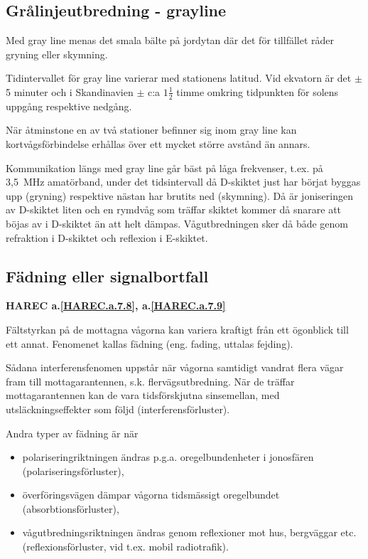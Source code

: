\subsection{Grålinjeutbredning - grayline}

Med gray line menas det smala bälte på jordytan där det för tillfället
råder gryning eller skymning.

Tidintervallet för gray line varierar med stationens latitud. Vid
ekvatorn är det \(\pm\) 5 minuter och i Skandinavien \(\pm\) c:a
\(1\frac{1}{2}\) timme omkring tidpunkten för solens uppgång
respektive nedgång.

När åtminstone en av två stationer befinner sig inom gray line kan
kortvågsförbindelse erhållas över ett mycket större avstånd än annars.

Kommunikation längs med gray line går bäst på låga frekvenser,
t.ex. på 3,5~MHz amatörband, under det tidsintervall då D-skiktet just
har börjat byggas upp (gryning) respektive nästan har brutits ned
(skymning). Då är joniseringen av D-skiktet liten och en rymdvåg som
träffar skiktet kommer då snarare att böjas av i D-skiktet än att helt
dämpas. Vågutbredningen sker då både genom refraktion i D-skiktet och
reflexion i E-skiktet.

\subsection{Fädning eller signalbortfall}
\textbf{
HAREC a.\ref{HAREC.a.7.8}\label{myHAREC.a.7.8},
 a.\ref{HAREC.a.7.9}\label{myHAREC.a.7.9}
}

Fältstyrkan på de mottagna vågorna kan variera kraftigt från ett
ögonblick till ett annat. Fenomenet kallas fädning (eng. fading,
uttalas fejding).

Sådana interferensfenomen uppstår när vågorna samtidigt vandrat flera
vägar fram till mottagarantennen, s.k. flervägsutbredning. När de
träffar mottagarantennen kan de vara tidsförskjutna sinsemellan, med
utsläckningseffekter som följd (interferensförluster).

Andra typer av fädning är när
\begin{itemize}
\item polariseringriktningen ändras p.g.a. oregelbundenheter i
  jonosfären (polariseringsförluster),
\item överföringsvägen dämpar vågorna tidsmässigt oregelbundet
  (absorbtionsförluster),
\item vågutbredningsriktningen ändras genom reflexioner mot hus,
  bergväggar etc. (reflexionsförluster, vid t.ex. mobil radiotrafik).
\end{itemize}

